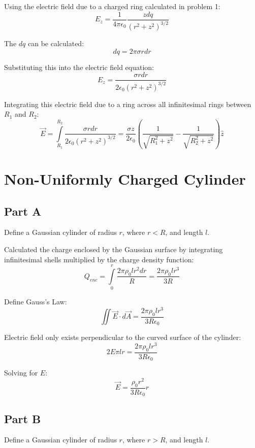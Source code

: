 \documentclass{article}
\begin{document}
Using the electric field due to a charged ring calculated in problem
1:
$$ E_{z} = \frac{ 1 }{ 4 \pi \epsilon_0 } \frac{ z dq }{ \left( r^{2} + z^{2}
\right)^{3/2} } $$

The $dq$ can be calculated:
$$ dq = 2 \pi \sigma r dr $$

Substituting this into the electric field equation:
$$ E_{z} = \frac{ \sigma r dr  }{ 2 \epsilon_0 \left( r^{2} + z^{2} \right)^{3/2} } $$

Integrating this electric field due to a ring across all infinitesimal rings
between $R_{1}$ and $R_{2}$:
$$ \vec{E} = \int\limits_{R_{1}}^{R_{2}} \frac{ \sigma r dr }{ 2 \epsilon_{0}
\left( r^{2} + z^{2} \right)^{3/2} } = \frac{ \sigma z }{ 2 \epsilon_0 } \left(
\frac{ 1 }{ \sqrt{R_{1}^{2} + z^{2}} } - \frac{ 1 }{ \sqrt{R^{2}_{2} + z^{2}}
}\right) \hat{z} $$

\section{Non-Uniformly Charged Cylinder}

\subsection*{Part A}

Define a Gaussian cylinder of radius $r$, where $r < R$, and length $l$.

\bigbreak

Calculated the charge enclosed by the Gaussian surface by integrating
infinitesimal shells multiplied by the charge density function:
$$ Q_{enc} = \int\limits_{0}^{r} \frac{ 2 \pi \rho_{0} l r^{2} dr }{ R } = \frac{ 2
\pi \rho_{0} l r^{3}}{ 3 R }$$

Define Gauss's Law:
$$ \iint \vec{E} \cdot d\vec{A} = \frac{ 2 \pi \rho_{0} l r^{3}}{ 3 R
\epsilon_{0} }$$

Electric field only exists perpendicular to the curved surface of the cylinder:
$$ 2 E \pi l r = \frac{ 2 \pi \rho_{0} l r^{3}}{ 3 R \epsilon_{0} } $$

Solving for $E$:
$$ \vec{E} = \frac{ \rho_{0} r^{2} }{ 3 R \epsilon_0 } \hat{r} $$

\subsection*{Part B}

Define a Gaussian cylinder of radius $r$, where $r > R$, and length $l$.
\end{document}
